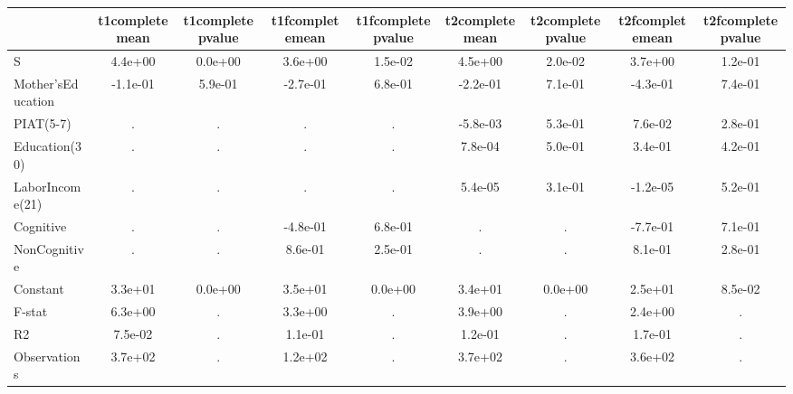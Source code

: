 \begin{table}[htbp]
\begin{tabular}{lcccccccc} \hline \hline
 & t1completemean  & t1completepvalue  & t1fcompletemean  & t1fcompletepvalue  & t2completemean  & t2completepvalue  & t2fcompletemean  & t2fcompletepvalue  \\  \hline 
S &  4.4e+00 &  0.0e+00 &  3.6e+00 &  1.5e-02 &  4.5e+00 &  2.0e-02 &  3.7e+00 &  1.2e-01 \\  
Mother'sEducation & -1.1e-01 &  5.9e-01 & -2.7e-01 &  6.8e-01 & -2.2e-01 &  7.1e-01 & -4.3e-01 &  7.4e-01 \\  
PIAT(5-7) &         . &         . &         . &         . & -5.8e-03 &  5.3e-01 &  7.6e-02 &  2.8e-01 \\  
Education(30) &         . &         . &         . &         . &  7.8e-04 &  5.0e-01 &  3.4e-01 &  4.2e-01 \\  
LaborIncome(21) &         . &         . &         . &         . &  5.4e-05 &  3.1e-01 & -1.2e-05 &  5.2e-01 \\  
Cognitive &         . &         . & -4.8e-01 &  6.8e-01 &         . &         . & -7.7e-01 &  7.1e-01 \\  
NonCognitive &         . &         . &  8.6e-01 &  2.5e-01 &         . &         . &  8.1e-01 &  2.8e-01 \\  
Constant &  3.3e+01 &  0.0e+00 &  3.5e+01 &  0.0e+00 &  3.4e+01 &  0.0e+00 &  2.5e+01 &  8.5e-02 \\  
F-stat &  6.3e+00 &         . &  3.3e+00 &         . &  3.9e+00 &         . &  2.4e+00 &         . \\  
R2 &  7.5e-02 &         . &  1.1e-01 &         . &  1.2e-01 &         . &  1.7e-01 &         . \\  
Observations &  3.7e+02 &         . &  1.2e+02 &         . &  3.7e+02 &         . &  3.6e+02 &         . \\  
\hline \hline \end{tabular}
\end{table}
